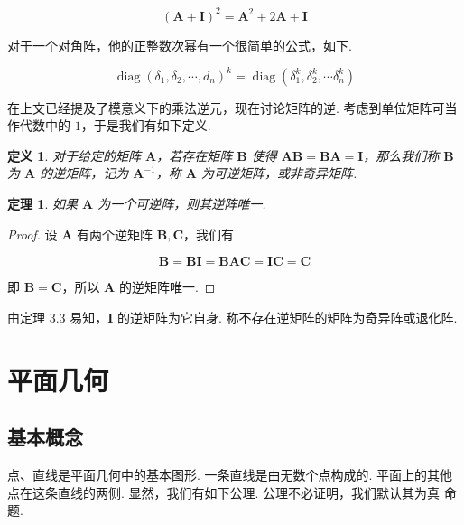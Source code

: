 \documentclass[a4paper]{article}
\newtheorem{theorem}{定理}[section]
\newtheorem{definition}{定义}[section]
\begin{document}
$$
    (\boldsymbol A+\boldsymbol I)^2=\boldsymbol A^2+2\boldsymbol A+\boldsymbol I
$$

对于一个对角阵，他的正整数次幂有一个很简单的公式，如下.

$$
    \operatorname{diag}(\delta_1,\delta_2,\cdots,d_n)^k=\operatorname{diag}(\delta_1^k,\delta_2^k,\cdots
    \delta_n^k)
$$

在上文已经提及了模意义下的乘法逆元，现在讨论矩阵的逆. 考虑到单位矩阵可当作代数中的 $1$，于是我们有如下定义.

\begin{definition}
    对于给定的矩阵 $\boldsymbol A$，若存在矩阵 $\boldsymbol B$ 使得 $\boldsymbol A\boldsymbol B=\boldsymbol B\boldsymbol A
        = \boldsymbol I$，那么我们称 $\boldsymbol B$ 为 $\boldsymbol A$ 的逆矩阵，记为 $\boldsymbol A^{-1}$，称 $\boldsymbol A$
    为可逆矩阵，或非奇异矩阵.
\end{definition}

\begin{theorem}
    如果 $\boldsymbol A$ 为一个可逆阵，则其逆阵唯一.
\end{theorem}

\begin{proof}
    设 $\boldsymbol A$ 有两个逆矩阵 $\boldsymbol B,\boldsymbol C$，我们有

    \begin{equation*}
        \boldsymbol B=\boldsymbol B\boldsymbol I=\boldsymbol B \boldsymbol A \boldsymbol C=\boldsymbol I \boldsymbol C
        = \boldsymbol C
    \end{equation*}

    即 $\boldsymbol B=\boldsymbol C$，所以 $\boldsymbol A$ 的逆矩阵唯一.
\end{proof}

由定理 3.3 易知，$\boldsymbol I$ 的逆矩阵为它自身. 称不存在逆矩阵的矩阵为奇异阵或退化阵.

\newpage

\section{平面几何}

\subsection{基本概念}

点、直线是平面几何中的基本图形. 一条直线是由无数个点构成的. 平面上的其他点在这条直线的两侧. 显然，我们有如下公理. 公理不必证明，我们默认其为真
命题.
\end{document}
